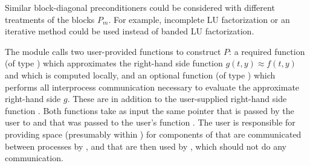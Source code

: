 Similar block-diagonal preconditioners could be considered with different
treatments of the blocks $P_m$. For example, incomplete LU factorization or
an iterative method could be used instead of banded LU factorization.

The {\cvbbdpre} module calls two user-provided functions to construct $P$:
a required function  (of type ) which approximates
the right-hand side function $g(t,y) \approx f(t,y)$ and which is computed locally,
and an optional function  (of type ) which performs
all interprocess communication necessary to evaluate the approximate right-hand
side $g$.  These are in addition to the user-supplied right-hand side function
.  Both functions take as input the same pointer  that is passed
by the user to  and that was passed to the user's function .
The user is responsible for providing space (presumably within )
for components of  that are communicated between processes by , and
that are then used by , which should not do any communication.

